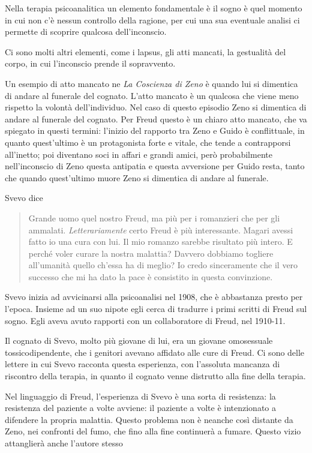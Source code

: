 \documentclass[a4paper, twoside, titlepage]{book}
\newcommand{\citazione}[1]{%
  \begin{quotation}
  \noindent #1
  \end{quotation}}
\begin{document}
Nella terapia psicoanalitica un elemento fondamentale è il sogno è quel momento in cui non c'è nessun controllo della ragione, per cui una sua eventuale analisi ci permette di scoprire qualcosa dell'inconscio.

Ci sono molti altri elementi, come i lapsus, gli atti mancati, la gestualità del corpo, in cui l'inconscio prende il sopravvento.

Un esempio di atto mancato ne \textit{La Coscienza di Zeno} è quando lui si dimentica di andare al funerale del cognato.
L'atto mancato è un qualcosa che viene meno rispetto la volontà dell'individuo. Nel caso di questo episodio Zeno si dimentica di andare al funerale del cognato. Per Freud questo è un chiaro atto mancato, che va spiegato in questi termini: l'inizio del rapporto tra Zeno e Guido è conflittuale, in quanto quest'ultimo è un protagonista forte e vitale, che tende a contrapporsi all'inetto; poi diventano soci in affari e grandi amici, però probabilmente nell'inconscio di Zeno questa antipatia e questa avversione per Guido resta, tanto che quando quest'ultimo muore Zeno si dimentica di andare al funerale.

Svevo dice
\citazione{Grande uomo quel nostro Freud, ma più per i romanzieri che per gli ammalati. \textit{Letterariamente} certo Freud è più interessante. Magari avessi fatto io una cura con lui. Il mio romanzo sarebbe risultato più intero. E perché voler curare la nostra malattia? Davvero dobbiamo togliere all'umanità quello ch'essa ha di meglio? Io credo sinceramente che il vero successo che mi ha dato la pace è consistito in questa convinzione.}

Svevo inizia ad avvicinarsi alla psicoanalisi nel 1908, che è abbastanza presto per l'epoca. Insieme ad un suo nipote egli cerca di tradurre i primi scritti di Freud sul sogno.
Egli aveva avuto rapporti con un collaboratore di Freud, nel 1910-11.

Il cognato di Svevo, molto più giovane di lui, era un giovane omosessuale tossicodipendente, che i genitori avevano affidato alle cure di Freud. Ci sono delle lettere in cui Svevo racconta questa esperienza, con l'assoluta mancanza di riscontro della terapia, in quanto il cognato venne distrutto alla fine della terapia.

Nel linguaggio di Freud, l'esperienza di Svevo è una sorta di resistenza: la resistenza del paziente a volte avviene: il paziente a volte è intenzionato a difendere la propria malattia.
Questo problema non è neanche così distante da Zeno, nei confronti del fumo, che fino alla fine continuerà a fumare.
Questo vizio attanglierà anche l'autore stesso
\end{document}
